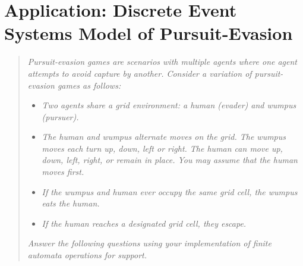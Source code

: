 \documentclass[12pt,letterpaper]{ntdhw}
\begin{document}
\clearpage
\section*{Application: Discrete Event Systems Model of Pursuit-Evasion}



\begin{quote}

\emph{\emph{Pursuit-evasion games} are scenarios with multiple agents
  where one agent attempts to avoid capture by another.  Consider a
  variation of pursuit-evasion games as follows:}

\begin{itemize}
  \item \it Two agents share a grid environment: a human (evader) and wumpus
  (pursuer).
  \item \it The human and wumpus alternate moves on the grid.  The
  wumpus moves each turn up, down, left or right.  The human can move
  up, down, left, right, or remain in place.  You may assume that the
  human moves first.
  \item \it If the wumpus and human ever occupy the same grid cell,
  the wumpus eats the human.
  \item \it If the human reaches a designated grid cell, they escape.
\end{itemize}

\emph{Answer the following questions using your implementation of finite
automata operations for support.}

\end{quote}
\end{document}
